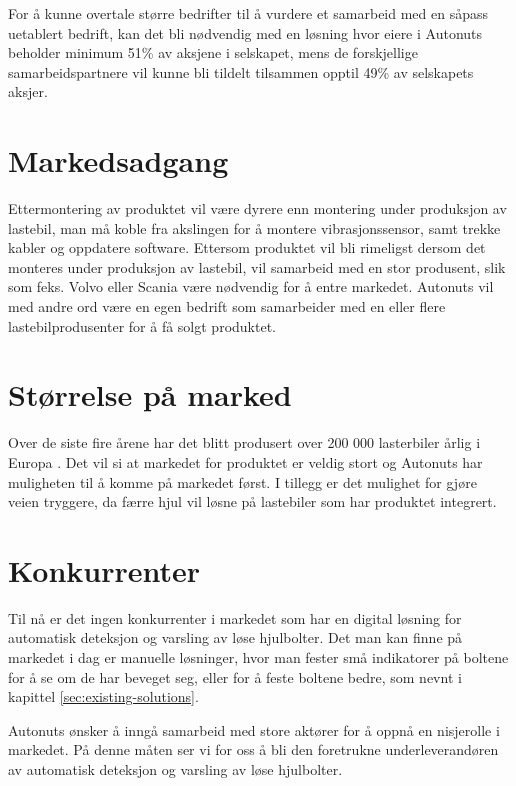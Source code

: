 For å kunne overtale større bedrifter til å vurdere et samarbeid med en såpass uetablert bedrift, kan det bli nødvendig med en løsning hvor eiere i Autonuts beholder minimum 51\% av aksjene i selskapet, mens de forskjellige samarbeidspartnere vil kunne bli tildelt tilsammen opptil 49\% av selskapets aksjer.

\section{Markedsadgang}

Ettermontering av produktet vil være dyrere enn montering under produksjon av 
lastebil, man må koble fra akslingen for å montere vibrasjonssensor, samt 
trekke kabler og oppdatere software. Ettersom produktet vil bli rimeligst 
dersom det monteres under produksjon av lastebil, vil  samarbeid med en stor 
produsent, slik som feks. Volvo eller Scania være nødvendig for å entre markedet. Autonuts vil med andre ord være en egen bedrift som samarbeider med en eller flere lastebilprodusenter for å få solgt produktet. 

\section{Størrelse på marked}

Over de siste fire årene har det blitt produsert over 200 000 lasterbiler årlig 
i Europa \cite{lastebilprod-DAF}. Det vil si at markedet for produktet er 
veldig stort og Autonuts har muligheten til å komme på markedet først. I tillegg er 
det mulighet for gjøre veien tryggere, da færre hjul vil løsne på lastebiler 
som har produktet integrert.

\section{Konkurrenter}
Til nå er det ingen konkurrenter i markedet som har en digital løsning for 
automatisk deteksjon og varsling av løse hjulbolter. Det man kan finne på 
markedet i dag er manuelle løsninger, hvor man fester små indikatorer på 
boltene for å se om de har beveget seg, eller for å feste boltene bedre, som nevnt i kapittel \ref{sec:existing-solutions}.

Autonuts ønsker å inngå samarbeid med store aktører for å oppnå en nisjerolle i 
markedet. På denne måten ser vi for oss å bli den foretrukne 
underleverandøren av automatisk deteksjon og varsling av løse hjulbolter.

